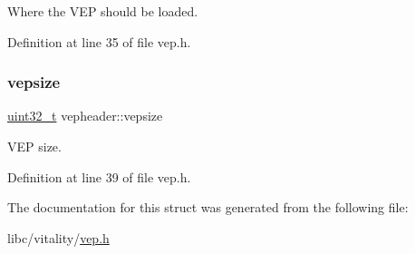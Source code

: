 Where the V\+EP should be loaded. 



Definition at line 35 of file vep.\+h.

\mbox{\label{a00080_a6121693fa5ac3673d831b440aea8963e_a6121693fa5ac3673d831b440aea8963e}} 
\subsubsection{\texorpdfstring{vepsize}{vepsize}}
{\footnotesize\ttfamily \hyperlink{a00047_a435d1572bf3f880d55459d9805097f62_a435d1572bf3f880d55459d9805097f62}{uint32\+\_\+t} vepheader\+::vepsize}



V\+EP size. 



Definition at line 39 of file vep.\+h.



The documentation for this struct was generated from the following file\+:\begin{DoxyCompactItemize}
\item 
libc/vitality/\hyperlink{a00062}{vep.\+h}\end{DoxyCompactItemize}
